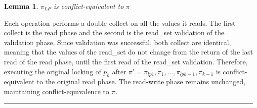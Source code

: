 \documentclass{article}
\newtheorem{lemma}[theorem]{Lemma}
\newenvironment{proof}[1][Proof]{\begin{trivlist}
\item[\hskip \labelsep {\bfseries #1}]}{\qedsymb\end{trivlist}}
\newcommand{\qedsymb}{\hfill{\rule{2mm}{2mm}}}
\newcommand{\code}[1]{\textsf{#1}}
\newcommand{\readSet}{\code{read\_set}\xspace}
\begin{document}
\begin{lemma}
$\pi_{LP}$ is conflict-equivalent to $\pi$
\end{lemma}
\begin{proof}
Each operation performs a double collect on all the values it reads. 
The first collect is the read phase and the second is the \readSet 
validation of the validation phase. Since validation was successful, 
both collect are identical, meaning that the values of the \readSet
do not change from the return of the last read of the read phase,
until the first read of the \readSet validation. Therefore, executing 
the original locking of $p_k$ after $\pi' =
\pi_{lp1},\pi_{1},\ldots,\pi_{lpk-1},\pi_{k-1}$ is conflict-equivalent
to the original read phase. The read-write phase remains unchanged, 
maintaining conflict-equivalence to $\pi$.
\end{proof}




\end{document}
